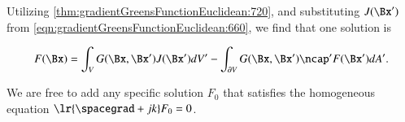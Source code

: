 Utilizing \cref{thm:gradientGreensFunctionEuclidean:720}, and substituting \( J(\Bx') \) from \cref{eqn:gradientGreensFunctionEuclidean:660}, we find that one solution is

\begin{dmath}\label{eqn:gradientGreensFunctionEuclidean:880}
F(\Bx)
=
\int_V G(\Bx, \Bx') J(\Bx') dV'
-
\int_{\partial V} G(\Bx, \Bx') \ncap' F(\Bx') dA'.
\end{dmath}

We are free to
add any specific solution \( F_0 \) that satisfies the homogeneous equation \( \lr{ \spacegrad + j k } F_0 = 0 \).
